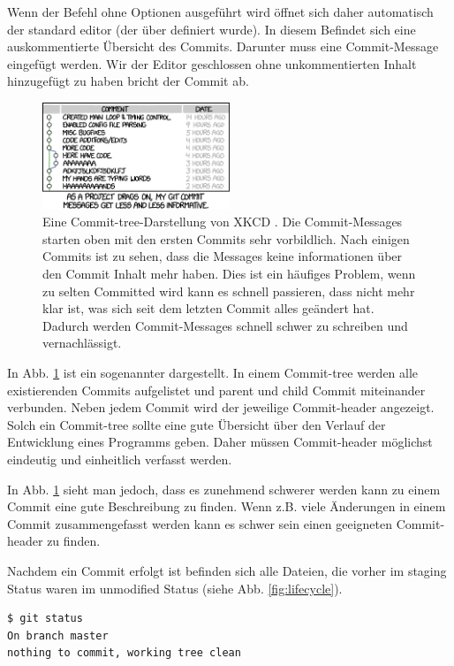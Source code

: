 Wenn der Befehl  ohne Optionen ausgeführt wird öffnet sich daher automatisch der standard editor (der über  definiert wurde). In diesem Befindet sich eine auskommentierte Übersicht des Commits. Darunter muss eine Commit-Message eingefügt werden. Wir der Editor geschlossen ohne unkommentierten Inhalt hinzugefügt zu haben bricht der Commit ab.
\begin{figure}[!h]
        \centering
        \includegraphics[width=0.5\textwidth]{Bilder/git_commit.png}
        \caption{Eine Commit-tree-Darstellung von XKCD \cite{Munroe}. Die Commit-Messages starten oben mit den ersten Commits sehr vorbildlich. Nach einigen Commits ist zu sehen, dass die Messages keine informationen über den Commit Inhalt mehr haben. Dies ist ein häufiges Problem, wenn zu selten Committed wird kann es schnell passieren, dass nicht mehr klar ist, was sich seit dem letzten Commit alles geändert hat. Dadurch werden Commit-Messages schnell schwer zu schreiben und vernachlässigt.}
        \label{fig:Commit-XKCD}
\end{figure}

In Abb. \ref{fig:Commit-XKCD} ist ein sogenannter  dargestellt. In einem Commit-tree werden alle existierenden Commits aufgelistet und parent und child Commit miteinander verbunden. Neben jedem Commit wird der jeweilige Commit-header angezeigt. Solch ein Commit-tree sollte eine gute Übersicht über den Verlauf der Entwicklung eines Programms geben. Daher müssen Commit-header möglichst eindeutig und einheitlich verfasst werden.

In Abb. \ref{fig:Commit-XKCD} sieht man jedoch, dass es zunehmend schwerer werden kann zu einem Commit eine gute Beschreibung zu finden. Wenn z.B. viele Änderungen in einem Commit zusammengefasst werden kann es schwer sein einen geeigneten Commit-header zu finden.

Nachdem ein Commit erfolgt ist befinden sich alle Dateien, die vorher im staging Status waren im unmodified Status (siehe Abb. \ref{fig:lifecycle}). 
\begin{lstlisting}
$ git status
On branch master
nothing to commit, working tree clean
\end{lstlisting}
%
